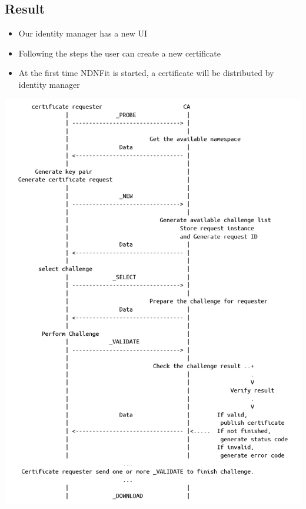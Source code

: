 \documentclass[a0,portrait]{poster}
\begin{document}
\begin{multicols}{2}
\section*{Result}
\begin{itemize}
	\item Our identity manager has a new UI
	\item Following the steps the user can create a new certificate
	\item At the first time NDNFit is started, a certificate will be distributed by identity manager
\end{itemize}

\begin{minipage}[b]{0.57\linewidth}
	\includegraphics[width=\linewidth]{figures/protocol.png}
\end{minipage}
\begin{minipage}[b]{0.43\linewidth}
	\centering

\end{minipage}
\end{multicols}
\end{document}
